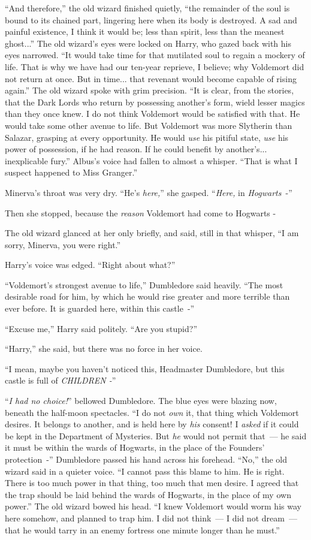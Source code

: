 ``And therefore,'' the old wizard finished quietly, ``the remainder of the soul is bound to its chained part, lingering here when its body is destroyed. A sad and painful existence, I think it would be; less than spirit, less than the meanest ghost...'' The old wizard's eyes were locked on Harry, who gazed back with his eyes narrowed. ``It would take time for that mutilated soul to regain a mockery of life. That is why we have had our ten-year reprieve, I believe; why Voldemort did not return at once. But in time... that revenant would become capable of rising again.'' The old wizard spoke with grim precision. ``It is clear, from the stories, that the Dark Lords who return by possessing another's form, wield lesser magics than they once knew. I do not think Voldemort would be satisfied with that. He would take some other avenue to life. But Voldemort was more Slytherin than Salazar, grasping at every opportunity. He would \emph{use} his pitiful state, \emph{use} his power of possession, if he had reason. If he could benefit by another's... inexplicable fury.'' Albus's voice had fallen to almost a whisper. ``That is what I suspect happened to Miss Granger.''

Minerva's throat was very dry. ``He's \emph{here,}'' she gasped. ``\emph{Here,} in \emph{Hogwarts}~-''

Then she stopped, because the \emph{reason} Voldemort had come to Hogwarts -

The old wizard glanced at her only briefly, and said, still in that whisper, ``I am sorry, Minerva, you were right.''

Harry's voice was edged. ``Right about what?''

``Voldemort's strongest avenue to life,'' Dumbledore said heavily. ``The most desirable road for him, by which he would rise greater and more terrible than ever before. It is guarded here, within this castle~-''

``Excuse me,'' Harry said politely. ``Are you stupid?''

``Harry,'' she said, but there was no force in her voice.

``I mean, maybe you haven't noticed this, Headmaster Dumbledore, but this castle is full of \emph{CHILDREN -}''

``\emph{I had no choice!}'' bellowed Dumbledore. The blue eyes were blazing now, beneath the half-moon spectacles. ``I do not \emph{own} it, that thing which Voldemort desires. It belongs to another, and is held here by \emph{his} consent! I \emph{asked} if it could be kept in the Department of Mysteries. But \emph{he} would not permit that~--- he said it must be within the wards of Hogwarts, in the place of the Founders' protection~-'' Dumbledore passed his hand across his forehead. ``No,'' the old wizard said in a quieter voice. ``I cannot pass this blame to him. He is right. There is too much power in that thing, too much that men desire. I agreed that the trap should be laid behind the wards of Hogwarts, in the place of my own power.'' The old wizard bowed his head. ``I knew Voldemort would worm his way here somehow, and planned to trap him. I did not think~--- I did not dream~--- that he would tarry in an enemy fortress one minute longer than he must.''

